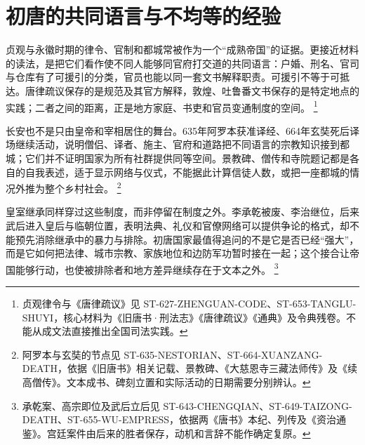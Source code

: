 \section{初唐的共同语言与不均等的经验}
\label{sec:early-tang-society-institutions}

贞观与永徽时期的律令、官制和都城常被作为一个“成熟帝国”的证据。更接近材料的读法，是把它们看作使不同人能够同官府打交道的共同语言：户婚、刑名、官司与仓库有了可援引的分类，官员也能以同一套文书解释职责。可援引不等于可抵达。唐律疏议保存的是规范及其官方解释，敦煌、吐鲁番文书保存的是特定地点的实践；二者之间的距离，正是地方家庭、书吏和官员变通制度的空间。%
\footnote{贞观律令与《唐律疏议》见 ST-627-ZHENGUAN-CODE、ST-653-TANGLU-SHUYI，核心材料为《旧唐书·刑法志》《唐律疏议》《通典》及令典残卷。不能从成文法直接推出全国司法实践。}

长安也不是只由皇帝和宰相居住的舞台。635年阿罗本获准译经、664年玄奘死后译场继续活动，说明僧侣、译者、施主、官府和道路把不同语言的宗教知识接到都城；它们并不证明国家为所有社群提供同等空间。景教碑、僧传和寺院题记都是各自的自我表述，适于显示网络与仪式，不能据此计算信徒人数，或把一座都城的情况外推为整个乡村社会。%
\footnote{阿罗本与玄奘的节点见 ST-635-NESTORIAN、ST-664-XUANZANG-DEATH，依据《旧唐书》相关记载、景教碑、《大慈恩寺三藏法师传》及《续高僧传》。文本成书、碑刻立置和实际活动的日期需要分别辨认。}

皇室继承同样穿过这些制度，而非停留在制度之外。李承乾被废、李治继位，后来武后进入皇后与临朝位置，表明法典、礼仪和官僚网络可以提供争论的格式，却不能预先消除继承中的暴力与排除。初唐国家最值得追问的不是它是否已经“强大”，而是它如何把法律、城市宗教、家族地位和边防军功暂时接在一起；这个接合让帝国能够行动，也使被排除者和地方差异继续存在于文本之外。%
\footnote{承乾案、高宗即位及武后立后见 ST-643-CHENGQIAN、ST-649-TAIZONG-DEATH、ST-655-WU-EMPRESS，依据两《唐书》本纪、列传及《资治通鉴》。宫廷案件由后来的胜者保存，动机和言辞不能作确定复原。}
